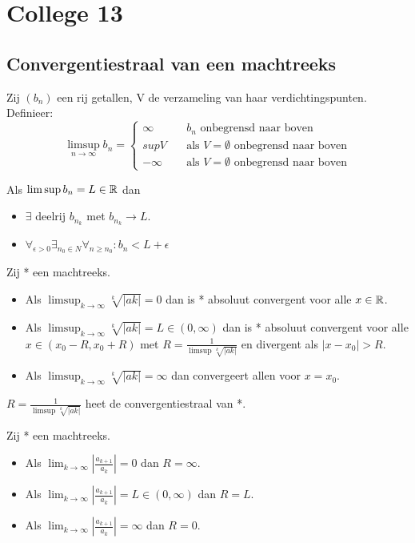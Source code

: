 \documentclass[week=1]{homework}
\begin{document}
	\newpage
	\section*{College 13}	
	
	\subsection*{Convergentiestraal van een machtreeks}
	\Def Zij $(b_n)$ een rij getallen, V de verzameling van haar verdichtingspunten. Definieer:
	\[
		\limsup_{n \to \infty} b_n = \begin{cases}
				\infty \quad &b_n \text{ onbegrensd naar boven} \\
				sup V \quad &\text{als } V = \emptyset \text{ onbegrensd naar boven}\\
				- \infty \quad &\text{als } V = \emptyset \text{ onbegrensd naar boven}
		\end{cases}		
	\]
	
	\Stel Als $\limsup b_n = L \in \mathbb{R}$ dan 
	\begin{itemize}
		\item $\exists$ deelrij $b_{n_k}$ met $b_{n_k} \to L$. 
		\item $\forall_{\epsilon > 0} \exists_{n_0 \in N} \forall_{n \ge n_0}: b_n < L + \epsilon$ 
	\end{itemize}
	
	 Zij * een machtreeks. 
	\begin{itemize}
		\item Als $\limsup_{k \to \infty} \sqrt[k]{|ak|} = 0$ dan is * absoluut convergent voor alle $x \in \mathbb{R}$. 
		\item Als $\limsup_{k \to \infty} \sqrt[k]{|ak|} = L \in (0,\infty)$ dan is * absoluut convergent voor alle $x \in (x_0 - R, x_0 + R)$ met $R = \frac{1}{\limsup \sqrt[k]{|ak|}}$ en divergent als $|x - x_0| > R$. 
		\item Als $\limsup_{k \to \infty} \sqrt[k]{|ak|} = \infty$ dan convergeert allen voor $x = x_0$. 
	\end{itemize}
	
	\Def $R = \frac{1}{\limsup \sqrt[k]{|ak|}}$ heet de convergentiestraal van *. 
	
	 Zij * een machtreeks. \begin{itemize}
		\item Als $\lim_{k \to \infty} \left| \frac{a_{k+1}}{a_k} \right| = 0$ dan $R = \infty$. 
		\item Als $\lim_{k \to \infty} \left| \frac{a_{k+1}}{a_k} \right| = L \in (0,\infty)$ dan $R = L$. 
		\item Als $\lim_{k \to \infty} \left| \frac{a_{k+1}}{a_k} \right| = \infty$ dan $R = 0$. 
	\end{itemize}
	
\end{document}
